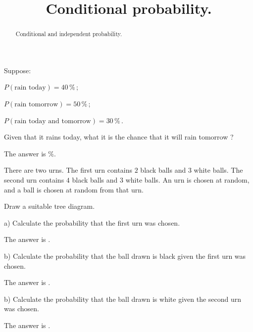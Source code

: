 \documentclass{ximera}
\title{Conditional probability.}
\begin{document}
\begin{abstract}
Conditional and independent probability.
\end{abstract}
\maketitle

\begin{question}
Suppose:

$P(\text{rain today})=40\,\%\,$; 

$P(\text{rain tomorrow})=50\,\%\,$; 

$P(\text{rain today and tomorrow})=30\,\%\,$.

Given that it rains today, what it is the chance that it will rain tomorrow ?
     \begin{solution}
           The answer is  $\%$.
     \end{solution}
\end{question}

There are two urns. The first urn contains $2$ black balls and $3$ white balls. The second urn contains $4$ black balls and $3$ white balls. An urn is chosen at random, and a ball is chosen at random from that urn.
     \begin{hint}
          Draw a suitable tree diagram.
     \end{hint}

\begin{question}
a) Calculate the probability that the first urn was chosen.
     \begin{solution}
           The answer is .
     \end{solution}
\end{question}

\begin{question}
b) Calculate the probability that the ball drawn is black given the first urn was chosen.
     \begin{solution}
           The answer is .
     \end{solution}
\end{question}

\begin{question}
b) Calculate the probability that the ball drawn is white given the second urn was chosen.
     \begin{solution}
           The answer is .
     \end{solution}
\end{question}
\end{document}
